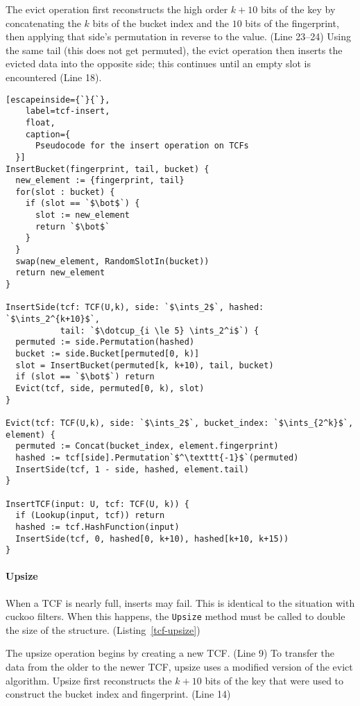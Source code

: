 \documentclass[sigconf]{acmart}
\newcommand{\ints}{\mathbb{Z}}
\newcommand{\dotcup}{\ensuremath{\mathaccent\cdot\cup}}
\begin{document}
The evict operation first reconstructs the high order $k + 10$ bits of the key by concatenating the $k$ bits of the bucket index and the $10$ bits of the fingerprint, then applying that side's permutation in reverse to the value. (Line 23--24)
Using the same tail (this does not get permuted), the evict operation then inserts the evicted data into the opposite side;
this continues until an empty slot is encountered (Line 18).

\begin{lstlisting}[escapeinside={`}{`},
    label=tcf-insert,
    float,
    caption={
      Pseudocode for the insert operation on TCFs
  }]
InsertBucket(fingerprint, tail, bucket) {
  new_element := {fingerprint, tail}
  for(slot : bucket) {
    if (slot == `$\bot$`) {
      slot := new_element
      return `$\bot$`
    }
  }
  swap(new_element, RandomSlotIn(bucket))
  return new_element
}

InsertSide(tcf: TCF(U,k), side: `$\ints_2$`, hashed: `$\ints_2^{k+10}$`,
           tail: `$\dotcup_{i \le 5} \ints_2^i$`) {
  permuted := side.Permutation(hashed)
  bucket := side.Bucket[permuted[0, k)]
  slot = InsertBucket(permuted[k, k+10), tail, bucket)
  if (slot == `$\bot$`) return
  Evict(tcf, side, permuted[0, k), slot)
}

Evict(tcf: TCF(U,k), side: `$\ints_2$`, bucket_index: `$\ints_{2^k}$`, element) {
  permuted := Concat(bucket_index, element.fingerprint)
  hashed := tcf[side].Permutation`$^\texttt{-1}$`(permuted)
  InsertSide(tcf, 1 - side, hashed, element.tail)
}

InsertTCF(input: U, tcf: TCF(U, k)) {
  if (Lookup(input, tcf)) return
  hashed := tcf.HashFunction(input)
  InsertSide(tcf, 0, hashed[0, k+10), hashed[k+10, k+15))
}
\end{lstlisting}

\paragraph{Upsize}
When a TCF is nearly full, inserts may fail.
This is identical to the situation with cuckoo filters.
When this happens, the \texttt{Upsize} method must be called to double the size of the structure. (Listing~\ref{tcf-upsize})

The upsize operation begins by creating a new TCF. (Line 9)
To transfer the data from the older to the newer TCF, upsize uses a modified version of the evict algorithm.
Upsize first reconstructs the $k+10$ bits of the key that were used to construct the bucket index and fingerprint. (Line 14)
\end{document}
